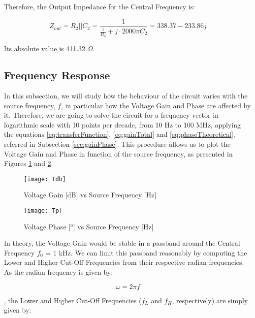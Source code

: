 Therefore, the Output Impedance for the Central Frequency is:

\begin{equation}
	Z_{out} = R_2 || C_2 = \frac{1}{\frac{1}{R_2} + j \cdot 2000\pi C_2} = 338.37 - 233.86j 
	\label{eq:outputImpVal}
\end{equation}

Its absolute value is 411.32 $\Omega$.


\subsection{Frequency Response}		\label{sec:freqResponse}

In this subsection, we will study how the behaviour of the circuit varies with the source frequency, $f$, in particular how the Voltage Gain and Phase are affected by it. Therefore, we are going to solve the circuit for a frequency vector in logarithmic scale with 10 points per decade, from 10 Hz to 100 MHz, applying the equations \ref{eq:transferFunction}, \ref{eq:gainTotal} and \ref{eq:phaseTheoretical}, referred in Subsection \ref{sec:gainPhase}. This procedure allows us to plot the Voltage Gain and Phase in function of the source frequency, as presented in Figures \ref{fig:Gain} and \ref{fig:Phase}.

\FloatBarrier
\begin{figure}[h] \centering
	\texttt{[image: Tdb]}
	\caption{Voltage Gain [dB] vs Source Frequency [Hz]}
	\label{fig:Gain}
\end{figure}
\FloatBarrier

\FloatBarrier
\begin{figure}[h] \centering
	\texttt{[image: Tp]}
	\caption{Voltage Phase [$^o$] vs Source Frequency [Hz]}
	\label{fig:Phase}
\end{figure}
\FloatBarrier

In theory, the Voltage Gain would be stable in a passband around the Central Frequency $f_0$ = 1 kHz. We can limit this passband reasonably by computing the Lower and Higher Cut-Off Frequencies from their respective radian frequencies. As the radian frequency is given by:

\begin{equation}
	\omega = 2\pi f
	\label{eq:radFreqCalc}
\end{equation} 

, the Lower and Higher Cut-Off Frequencies ($f_L$ and $f_H$, respectively) are simply given by:


